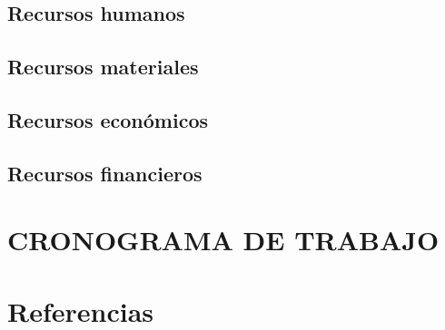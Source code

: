 \documentclass[12pt]{article}
\begin{document}
\subsection{Recursos humanos}
\lipsum[1]
\subsection{Recursos materiales}
\lipsum[1]
\subsection{Recursos económicos}
\lipsum[1]
\subsection{Recursos financieros}
\lipsum[1]
\section*{CRONOGRAMA DE TRABAJO}
\lipsum[1]

\cite{prueba}

\newpage
\section{Referencias}


\end{document}

